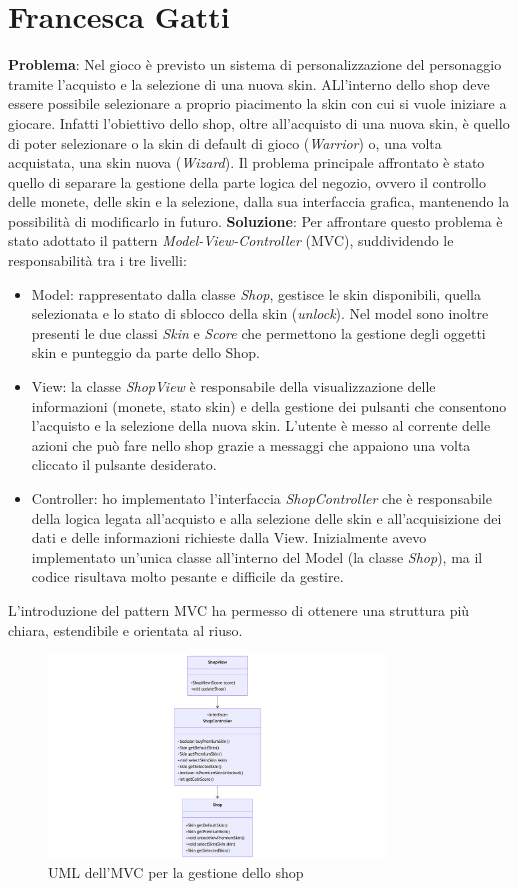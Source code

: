 \documentclass[a4paper,12pt]{report}
\begin{document}
\section{Francesca Gatti}
\textbf{Problema}: Nel gioco è previsto un sistema di personalizzazione del personaggio tramite l'acquisto e la selezione di una nuova skin.
ALl'interno dello shop deve essere possibile selezionare a proprio piacimento la skin con cui si vuole iniziare a giocare. Infatti l'obiettivo dello
shop, oltre all'acquisto di una nuova skin, è quello di poter selezionare o la skin di default di gioco (\emph{Warrior}) o, una volta acquistata, una skin 
nuova (\emph{Wizard}). 
Il problema principale affrontato è stato quello di separare la gestione della parte logica del negozio, ovvero il controllo delle monete, 
delle skin e la selezione, dalla sua interfaccia grafica, mantenendo la possibilità di modificarlo in futuro.
\textbf{Soluzione}: Per affrontare questo problema è stato adottato il pattern \emph{Model-View-Controller} (MVC), suddividendo le responsabilità 
tra i tre livelli:
\begin{itemize}
    \item Model: rappresentato dalla classe \emph{Shop}, gestisce le skin disponibili, quella selezionata e lo stato di sblocco della skin (\emph{unlock}). 
    Nel model sono inoltre presenti le due classi \emph{Skin} e \emph{Score} che permettono la gestione degli oggetti skin e punteggio da parte dello Shop.
    \item View: la classe \emph{ShopView} è responsabile della visualizzazione delle informazioni (monete, stato skin) e della gestione dei pulsanti 
    che consentono l'acquisto e la selezione della nuova skin. L'utente è messo al corrente delle azioni che può fare nello shop grazie a 
    messaggi che appaiono una volta cliccato il pulsante desiderato.
    \item Controller: ho implementato l'interfaccia \emph{ShopController} che è responsabile della logica legata all'acquisto e alla selezione 
    delle skin e all'acquisizione dei dati e delle informazioni richieste dalla View. Inizialmente avevo implementato un'unica classe 
    all'interno del Model (la classe \emph{Shop}), ma il codice risultava molto pesante e difficile da gestire.
\end{itemize}
L'introduzione del pattern MVC ha permesso di ottenere una struttura più chiara, estendibile e orientata al riuso.
\begin{figure}
    \centering
    \includegraphics[width=0.8\textwidth]{resources/UMLshop.png}
    \caption{UML dell'MVC per la gestione dello shop}
\end{figure}
\end{document}
